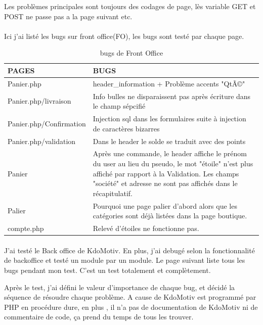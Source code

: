 Les problèmes principales sont toujours des codages de page, lès variable GET et POST ne passe pas a la page suivant etc.


\paragraph{}
Ici j'ai listé les bugs sur front office(FO), les bugs sont testé par chaque page. 

\begin{table}[htbp]
\renewcommand{\tabularxcolumn}[1]{>{\arraybackslash}m{#1}}
\begin{tabularx}{\textwidth}{lX}
\hline 
PAGES
 & BUGS
 \\ 
\hline 
Panier.php
 & header\_information + Problème accents "QtÃ©"
 \\ 
\hline 
Panier.php/livraison
 & Info bulles ne disparaissent pas après écriture dans le champ sépcifié
 \\ 
\hline 
Panier.php/Confirmation
 & Injection sql dans les formulaires suite à injection de caractères bizarres
 \\ 
\hline 
Panier.php/validation
 & Dans le header le solde se traduit avec des points
 \\ 
\hline 
Panier
 & Après une commande, le header affiche le prénom du user au lieu du pseudo, le mot "étoile" n'est plus affiché par rapport à la Validation. Les champs "société" et adresse ne sont pas affichés dans le récapitulatif.
 \\ 
\hline 
Palier
 & Pourquoi une page palier  d'abord alors que les catégories sont déjà listées dans la page boutique.
 \\ 
\hline 
compte.php
 & Relevé d'étoiles ne fonctionne pas.
 \\ 
\hline 
\end{tabularx} 
 \caption{bugs de Front Office}
\end{table}

\paragraph{}
J'ai testé le Back office de KdoMotiv. En plus, j'ai debugé selon la fonctionnalité de backoffice et testé un module par un module. Le page suivant liste tous les bugs pendant mon test. C'est un test totalement et complètement. 

Après le test, j'ai défini le valeur d'importance de chaque bug, et décidé la séquence de résoudre chaque problème. A cause de KdoMotiv est programmé par PHP en procédure dure, en plus , il n'a pas de documentation de KdoMotiv ni de commentaire de code, ça prend du temps de tous les trouver.

